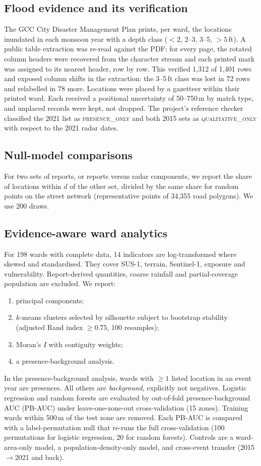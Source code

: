 \documentclass[conference]{IEEEtran}
\begin{document}
\subsection{Flood evidence and its verification}
The GCC City Disaster Management Plan prints, per ward, the locations inundated in each monsoon year with a depth class (${<}2$, 2--3, 3--5, ${>}5$\,ft). A public table extraction was re-read against the PDF: for every page, the rotated column headers were recovered from the character stream and each printed mark was assigned to its nearest header, row by row. This verified 1{,}312 of 1{,}401 rows and exposed column shifts in the extraction: the 3--5\,ft class was lost in 72 rows and relabelled in 78 more. Locations were placed by a gazetteer within their printed ward. Each received a positional uncertainty of 50--750\,m by match type, and unplaced records were kept, not dropped. The project's reference checker classified the 2021 list as \textsc{presence\_only} and both 2015 sets as \textsc{qualitative\_only} with respect to the 2021 radar dates.

\subsection{Null-model comparisons}
For two sets of reports, or reports versus radar components, we report the share of locations within $d$ of the other set, divided by the same share for random points on the street network (representative points of 34{,}355 road polygons). We use 200 draws.

\subsection{Evidence-aware ward analytics}
For 198 wards with complete data, 14 indicators are log-transformed where skewed and standardised. They cover SUS-1, terrain, Sentinel-1, exposure and vulnerability. Report-derived quantities, coarse rainfall and partial-coverage population are excluded. We report:
\begin{enumerate}
\item principal components;
\item $k$-means clusters selected by silhouette \cite{rousseeuw1987silhouette} subject to bootstrap stability (adjusted Rand index \cite{hubert1985ari} $\ge 0.75$, 100 resamples);
\item Moran's $I$ \cite{moran1950} with contiguity weights;
\item a presence-background analysis.
\end{enumerate}
In the presence-background analysis, wards with $\geq 1$ listed location in an event year are presences. All others are \emph{background}, explicitly not negatives. Logistic regression and random forests \cite{breiman2001rf,pedregosa2011sklearn} are evaluated by out-of-fold presence-background AUC (PB-AUC) under leave-one-zone-out cross-validation (15 zones). Training wards within 500\,m of the test zone are removed. Each PB-AUC is compared with a label-permutation null that re-runs the full cross-validation (100 permutations for logistic regression, 20 for random forests). Controls are a ward-area-only model, a population-density-only model, and cross-event transfer (2015$\to$2021 and back).
\end{document}
